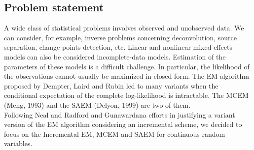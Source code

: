 \documentclass[a0,portrait]{a0poster}
\begin{document}
\begin{multicols}{2}
\section{Problem statement}
\color{Navy} %
A wide class of statistical problems involves observed and unobserved data. We can consider, for example,
inverse problems concerning deconvolution, source separation, change-points detection, etc. Linear and nonlinear
mixed effects models can also be considered incomplete-data models. Estimation of the parameters of these
models is a difficult challenge. In particular, the likelihood of the observations cannot usually be maximized in
closed form. The EM algorithm proposed by Dempter, Laird and Rubin led to many variants when the conditional expectation of the complete log-likelihood is intractable. The MCEM (Meng, 1993) and the SAEM (Delyon, 1999) are two of them.\\
Following Neal and Radford and Gunawardana efforts in justifying a variant version of the EM algorithm considering an incremental scheme, we decided to focus on the Incremental EM, MCEM and SAEM for continuous random variables.


\color{DarkSlateGray} %


\end{multicols}
\end{document}
